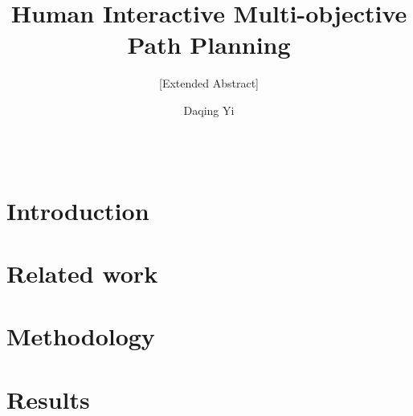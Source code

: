 \documentclass{acm_proc_article-sp}
\begin{document}
\title{Human Interactive Multi-objective Path Planning}
\subtitle{[Extended Abstract]
}

\author{
\alignauthor
Daqing Yi \\%
       \\
       \\
}

\date{}

\maketitle
\begin{abstract}
\end{abstract}

\begin{comment}
Extended abstract — an anonymized, two-page description of the applicant's past, current, or proposed work (templates available) covering:
(1)the key research questions/motivation of the applicant's work,
(2)background and related work that informs the research,
(3)the research approach and methodology, and
(4)results to date (if any) and a description of remaining work.
\end{comment}

\section{Introduction}

\section{Related work}

\section{Methodology}

\section{Results}



\end{document}
